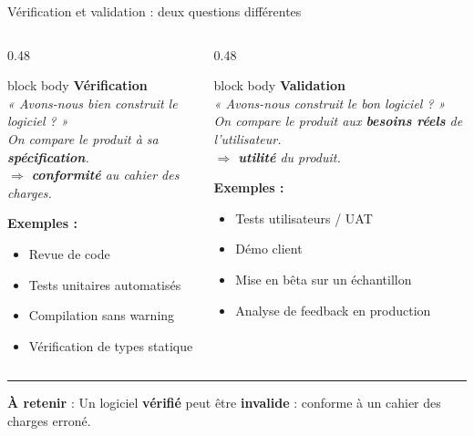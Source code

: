 \documentclass[aspectratio=169,11pt]{beamer}
\newcommand{\takeaway}[1]{%
\vfill\begin{beamercolorbox}[wd=\linewidth,sep=0.4em]{}
\color{accent2}\rule[0.6ex]{1.2em}{1.2pt}\hspace{0.4em}%
\textbf{\color{accent2}\small À retenir} \textcolor{textsoft}{:} %
{\small\color{textmain}#1}
\end{beamercolorbox}}
\begin{document}
\begin{frame}[t]{Vérification et validation : deux questions différentes}
\vspace{0.1cm}
\begin{columns}[T,onlytextwidth]
\begin{column}{0.48\textwidth}
\begin{beamercolorbox}[sep=0.6em,rounded=true]{block body}
\centering\textbf{\color{accent}Vérification}\\[0.2em]
\large\itshape « Avons-nous bien construit le logiciel ? »\\[0.4em]
\footnotesize\normalfont
On compare le produit à sa \textbf{spécification}.\\
$\Rightarrow$ \textbf{conformité} au cahier des charges.
\end{beamercolorbox}
\vspace{0.4em}\footnotesize
\textbf{Exemples :}
\begin{itemize}\scriptsize
\item Revue de code
\item Tests unitaires automatisés
\item Compilation sans warning
\item Vérification de types statique
\end{itemize}
\end{column}
\begin{column}{0.48\textwidth}
\begin{beamercolorbox}[sep=0.6em,rounded=true]{block body}
\centering\textbf{\color{accent2}Validation}\\[0.2em]
\large\itshape « Avons-nous construit le bon logiciel ? »\\[0.4em]
\footnotesize\normalfont
On compare le produit aux \textbf{besoins réels} de l'utilisateur.\\
$\Rightarrow$ \textbf{utilité} du produit.
\end{beamercolorbox}
\vspace{0.4em}\footnotesize
\textbf{Exemples :}
\begin{itemize}\scriptsize
\item Tests utilisateurs / UAT
\item Démo client
\item Mise en bêta sur un échantillon
\item Analyse de feedback en production
\end{itemize}
\end{column}
\end{columns}
\takeaway{Un logiciel \textbf{vérifié} peut être \textbf{invalide} : conforme à un cahier des charges erroné.}
\end{frame}
\end{document}
